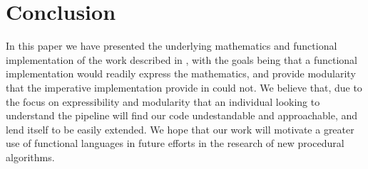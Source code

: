 \documentclass[twocolumn]{article}
\begin{document}
\section{Conclusion}
In this paper we have presented the underlying mathematics and functional
implementation of the work described in \cite{chen}, with the goals being that
a functional implementation would readily express the mathematics, and provide
modularity that the imperative implementation provide in \cite{chen} could not.
We believe that, due to the focus on expressibility and modularity that an
individual looking to understand the pipeline will find our code undestandable
and approachable, and lend itself to be easily extended. We hope that our work
will motivate a greater use of functional languages in future efforts in the
research of new procedural algorithms.



\end{document}
